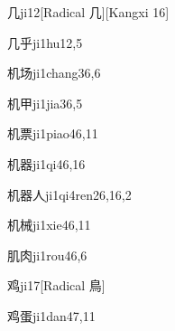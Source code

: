 
\begin{verbete}{几}{ji1}{2}[Radical 几][Kangxi 16]
\end{verbete}

\begin{verbete}{几乎}{ji1hu1}{2,5}
\end{verbete}

\begin{verbete}{机场}{ji1chang3}{6,6}
\end{verbete}

\begin{verbete}{机甲}{ji1jia3}{6,5}
\end{verbete}

\begin{verbete}{机票}{ji1piao4}{6,11}
\end{verbete}

\begin{verbete}{机器}{ji1qi4}{6,16}
\end{verbete}

\begin{verbete}{机器人}{ji1qi4ren2}{6,16,2}
\end{verbete}

\begin{verbete}{机械}{ji1xie4}{6,11}
\end{verbete}

\begin{verbete}{肌肉}{ji1rou4}{6,6}
\end{verbete}

\begin{verbete}{鸡}{ji1}{7}[Radical 鳥]
\end{verbete}

\begin{verbete}{鸡蛋}{ji1dan4}{7,11}
\end{verbete}

